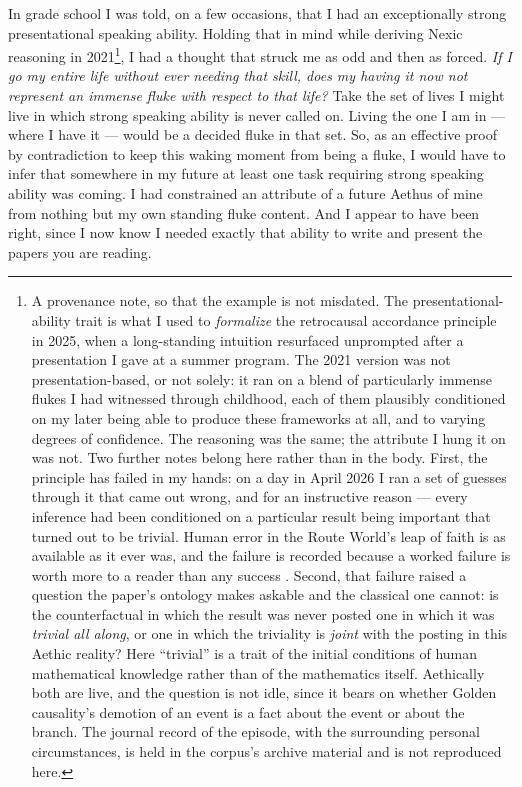 \documentclass[11pt]{article}
\numberwithin{equation}{section}
\theoremstyle{plain}
\theoremstyle{definition}
\theoremstyle{remark}
\begin{document}
In grade school I was told, on a few occasions, that I had an
exceptionally strong presentational speaking ability. Holding that in
mind while deriving Nexic reasoning in 2021\footnote{A provenance note, so that the example is not misdated. The presentational-ability trait is what I used to \emph{formalize} the retrocausal accordance principle in 2025, when a long-standing intuition resurfaced unprompted after a presentation I gave at a summer program. The 2021 version was not presentation-based, or not solely: it ran on a blend of particularly immense flukes I had witnessed through childhood, each of them plausibly conditioned on my later being able to produce these frameworks at all, and to varying degrees of confidence. The reasoning was the same; the attribute I hung it on was not. Two further notes belong here rather than in the body. First, the principle has failed in my hands: on a day in April 2026 I ran a set of guesses through it that came out wrong, and for an instructive reason --- every inference had been conditioned on a particular result being important that turned out to be trivial. Human error in the Route World's leap of faith is as available as it ever was, and the failure is recorded because a worked failure is worth more to a reader than any success \cite{koide1983new, Brannen2006TheLM}. Second, that failure raised a question the paper's ontology makes askable and the classical one cannot: is the counterfactual in which the result was never posted one in which it was \emph{trivial all along}, or one in which the triviality is \emph{joint} with the posting in this Aethic reality? Here ``trivial'' is a trait of the initial conditions of human mathematical knowledge rather than of the mathematics itself. Aethically both are live, and the question is not idle, since it bears on whether Golden causality's demotion of an event is a fact about the event or about the branch. The journal record of the episode, with the surrounding personal circumstances, is held in the corpus's archive material and is not reproduced here.}, I had a thought that struck
me as odd and then as forced. \emph{If I go my entire life without ever
needing that skill, does my having it now not represent an immense fluke
with respect to that life?} Take the set of lives I might live in which
strong speaking ability is never called on. Living the one I am in ---
where I have it --- would be a decided fluke in that set. So, as an
effective proof by contradiction to keep this waking moment from being a
fluke, I would have to infer that somewhere in my future at least one
task requiring strong speaking ability was coming. I had constrained an
attribute of a future Aethus of mine from nothing but my own standing
fluke content. And I appear to have been right, since I now know I
needed exactly that ability to write and present the papers you are
reading.
\end{document}
